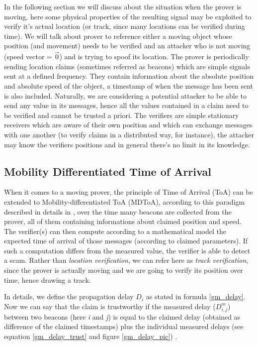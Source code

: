 In the following section we will discuss about the situation when the prover is moving, here some physical properties of the resulting signal may be exploited to verify it's actual location (or track, since many locations can be verified during time). We will talk about prover to reference either a moving object whose position (and movement) needs to be verified and an attacker who is not moving (speed vector = \(\vec{0}\)) and is trying to spoof its location. The prover is periodically sending location claims (sometimes referred as beacons) which are simple signals sent at a defined frequency. They contain information about the absolute position and absolute speed of the object, a timestamp of when the message has been sent is also included. Naturally, we are considering a potential attacker to be able to send any value in its messages, hence all the values contained in a claim need to be verified and cannot be trusted a priori. The verifiers are simple stationary receivers which are aware of their own position and which can exchange messages with one another (to verify claims in a distributed way, for instance), the attacker may know the verifiers positions and in general there's no limit in its knowledge.

\subsection{Mobility Differentiated Time of Arrival} \label{gm_sec_mtdoa}

When it comes to a moving prover, the principle of Time of Arrival (ToA) can be extended to Mobility-differentiated ToA (MDToA), according to this paradigm described in details in \cite{schaefer15}, over the time many beacons are collected from the prover, all of them containing informations about claimed position and speed. The verifier(s) can then compute according to a mathematical model the expected time of arrival of those messages (according to claimed parameters). If such a computation differs from the measured value, the verifier is able to detect a scam. Rather than \textit{location verification}, we can refer here as \textit{track verification}, since the prover is actually moving and we are going to verify its position over time, hence drawing a track.

In details, we define the propagation delay \(D_i\) as stated in formula \eqref{gm_delay}. Now we can say that the claim is trustworthy if the measured delay (\(D_{i,j}^m\)) between two beacons (here \textit{i} and \textit{j}) is equal to the claimed delay (obtained as difference of the claimed timestamps) plus the individual measured delays (see equation \eqref{gm_delay_trust} and figure \ref{gm_delay_pic}) \cite{schaefer15}.

